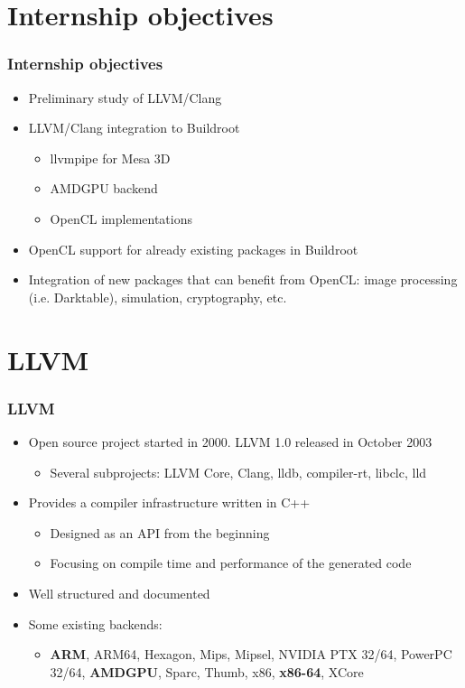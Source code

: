 \documentclass{smilebeamer}
\begin{document}
\section{Internship objectives}

\begin{frame}
\frametitle{Internship objectives}
\begin{itemize}
  \item Preliminary study of LLVM/Clang
  \item LLVM/Clang integration to Buildroot
  \begin{itemize}
    \item llvmpipe for Mesa 3D
    \item AMDGPU backend
    \item OpenCL implementations
  \end{itemize}
  \item OpenCL support for already existing packages in Buildroot
  \item Integration of new packages that can benefit from OpenCL:
  image processing (i.e. Darktable), simulation, cryptography, etc.
\end{itemize}
\end{frame}
\section{LLVM}

\begin{frame}
\frametitle{LLVM}
\begin{itemize}
  \item Open source project started in 2000. LLVM 1.0 released in October 2003
  \begin{itemize}
    \item Several subprojects: LLVM Core, Clang, lldb, compiler-rt, libclc, lld
  \end{itemize}
  \item Provides a compiler infrastructure written in C++
  \begin{itemize}
    \item Designed as an API from the beginning
    \item Focusing on compile time and performance of the generated code
  \end{itemize}
  \item Well structured and documented
  \item Some existing backends:
  \begin{itemize}
    \item \textbf{ARM}, ARM64, Hexagon, Mips, Mipsel, NVIDIA PTX 32/64,
    PowerPC 32/64, \textbf{AMDGPU}, Sparc, Thumb, x86, \textbf{x86-64}, XCore
  \end{itemize}
\end{itemize}
\end{frame}
\end{document}
